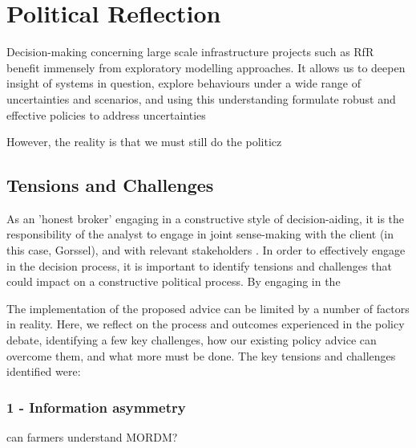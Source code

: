 \section{Political Reflection}
\label{s:poli_reflect}
Decision-making concerning large scale infrastructure projects such as RfR benefit immensely from exploratory modelling approaches. It allows us to deepen insight of systems in question, explore behaviours under a wide range of uncertainties and scenarios, and using this understanding formulate robust and effective policies to address uncertainties \parencite{}

However, the reality is that we must still do the politicz

\subsection{Tensions and Challenges}

As an 'honest broker' engaging in a constructive style of decision-aiding, it is the responsibility of the analyst to engage in joint sense-making with the client (in this case, Gorssel), and with relevant stakeholders \parencite{tsoukias_decision_2008}. In order to effectively engage in the decision process, it is important to identify tensions and challenges that could impact on a constructive political process. 
By engaging in the 

The implementation of the proposed advice can be limited by a number of factors in reality. Here, we reflect on the process and outcomes experienced in the policy debate, identifying a few key challenges, how our existing policy advice can overcome them, and what more must be done. The key tensions and challenges identified were:

\subsubsection{1 - Information asymmetry}
can farmers understand MORDM?

